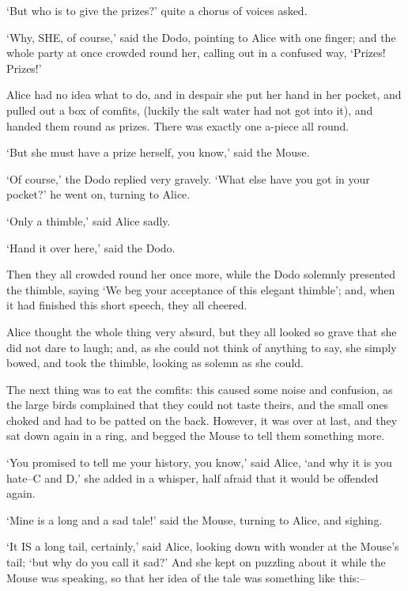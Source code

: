 \documentclass[12pt]{book}
\begin{document}
  `But who is to give the prizes?' quite a chorus of voices
asked.

  `Why, SHE, of course,' said the Dodo, pointing to Alice with
one finger; and the whole party at once crowded round her,
calling out in a confused way, `Prizes! Prizes!'

  Alice had no idea what to do, and in despair she put her hand
in her pocket, and pulled out a box of comfits, (luckily the salt
water had not got into it), and handed them round as prizes.
There was exactly one a-piece all round.

  `But she must have a prize herself, you know,' said the Mouse.

  `Of course,' the Dodo replied very gravely.  `What else have
you got in your pocket?' he went on, turning to Alice.

  `Only a thimble,' said Alice sadly.

  `Hand it over here,' said the Dodo.

  Then they all crowded round her once more, while the Dodo
solemnly presented the thimble, saying `We beg your acceptance of
this elegant thimble'; and, when it had finished this short
speech, they all cheered.

  Alice thought the whole thing very absurd, but they all looked
so grave that she did not dare to laugh; and, as she could not
think of anything to say, she simply bowed, and took the thimble,
looking as solemn as she could.

  The next thing was to eat the comfits:  this caused some noise
and confusion, as the large birds complained that they could not
taste theirs, and the small ones choked and had to be patted on
the back.  However, it was over at last, and they sat down again
in a ring, and begged the Mouse to tell them something more.

  `You promised to tell me your history, you know,' said Alice,
`and why it is you hate--C and D,' she added in a whisper, half
afraid that it would be offended again.

  `Mine is a long and a sad tale!' said the Mouse, turning to
Alice, and sighing.

  `It IS a long tail, certainly,' said Alice, looking down with
wonder at the Mouse's tail; `but why do you call it sad?'  And
she kept on puzzling about it while the Mouse was speaking, so
that her idea of the tale was something like this:--
\end{document}
